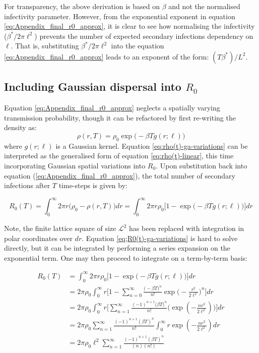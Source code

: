 For transparency, the above derivation is based on $\beta$ and not the normalised infectivity parameter. 
However, from the exponential exponent in equation \ref{eq:Appendix_final_r0_approx}, it is clear to see how normalising the infectivity ($\beta^*/2\pi\ell^2$) prevents
the number of expected secondary infections dependency on $\ell$. That is, substituting $\beta^*/2\pi\ell^2$ into the equation \ref{eq:Appendix_final_r0_approx} leads to an exponent of the form: $(T\beta^*)/L^2$.

\subsection{Including Gaussian dispersal into $R_0$}

\label{sec:r0-derivation}
Equation \ref{eq:Appendix_final_r0_approx} neglects a spatially varying transmission probability, 
though it can be refactored by first re-writing the density as:
\begin{equation}
\label{eq:rho(t)-ga-variations}
    \rho(r, T) = \rho_0\exp \big(-\beta T g(r; \ell) \big)
\end{equation}
where $g(r;\ell)$ is a Gaussian kernel. 
Equation \ref{eq:rho(t)-ga-variations} can be interpreted as the generalised form of equation \ref{eq:rho(t)-linear}, this time incorporating Gaussian spatial variations into $R_0$.
Upon substitution back into equation (\ref{eq:Appendix_final_r0_approx}), the total number of secondary infections after $T$ time-steps is given by:

\begin{equation}
\label{eq;R0(t)-ga-variations}
   R_0(T) = \int ^\infty _0 2\pi r \big (\rho_0 - \rho(r, T)\big)dr =  \int ^\infty _0 2\pi r \rho_0 \Big[1 - \exp\big(-\beta T g(r;\ell)\big) \Big]dr
\end{equation}

Note, the finite lattice square of size $\mathcal{L}^2$ has been replaced with integration in polar coordinates over $dr$. 
Equation \ref{eq;R0(t)-ga-variations} is hard to solve directly, but it can be integrated by performing a series expansion on the exponential term. 
One may then proceed to integrate on a term-by-term basis:

\begin{equation} 
\label{eq:Appendix_final_expression}
\begin{split}
R_0(T) & = \int^\infty_0 2\pi r \rho_0 \Big[1 - \exp \big( -\beta T g(r;\ell)\big)\Big]dr \\
& = 2\pi\rho_0 \int^\infty _0 r \Big[1 - \sum^\infty_{n=0} \frac{\big(-\beta T)^n}{n!} \exp\big(-\frac{r^2}{2\ell^2}\big)^n  \Big] dr \\
& = 2\pi\rho_0 \int^\infty _0 r \Big[\sum^\infty_{n=1} \frac{(-1)^{n+1}\big(\beta T)^n}{n!} \Big(\exp(-\frac{n r^2}{2\ell^2} ) \Big)  \Big] dr \\
& = 2\pi\rho_0 \sum^{\infty}_{n=1} \frac{(-1)^{n+1} (\beta T)^n}{n!} \int^\infty _0 r \exp(-\frac{n r^2}{2\ell^2})dr  \\
& = 2\pi\rho_0 \ell^2 \sum^{\infty}_{n=1} \frac{(-1)^{n+1}(\beta T)^n}{(n)(n!) }
\end{split}
\end{equation}

